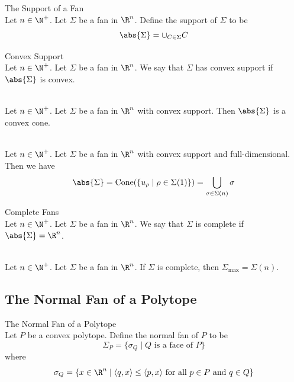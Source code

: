 \documentclass[a4paper]{article}
\begin{document}
\begin{defn}{The Support of a Fan}{}\\
Let $n\in\N^+$. Let $\Sigma$ be a fan in $\R^n$. Define the support of $\Sigma$ to be $$\abs{\Sigma}=\cup_{C\in\Sigma}C$$
\end{defn}

\begin{defn}{Convex Support}{}\\
Let $n\in\N^+$. Let $\Sigma$ be a fan in $\R^n$. We say that $\Sigma$ has convex support if $\abs{\Sigma}$ is convex. 
\end{defn}

\begin{lmm}{}{}\\
Let $n\in\N^+$. Let $\Sigma$ be a fan in $\R^n$ with convex support. Then $\abs{\Sigma}$ is a convex cone. 
\end{lmm}

\begin{lmm}{}{}\\
Let $n\in\N^+$. Let $\Sigma$ be a fan in $\R^n$ with convex support and full-dimensional. Then we have $$\abs{\Sigma}=\text{Cone}(\{u_\rho\;|\;\rho\in\Sigma(1)\})=\bigcup_{\sigma\in\Sigma(n)}\sigma$$
\end{lmm}

\begin{defn}{Complete Fans}{}\\
Let $n\in\N^+$. Let $\Sigma$ be a fan in $\R^n$. We say that $\Sigma$ is complete if $\abs{\Sigma}=\R^n$. 
\end{defn}

\begin{lmm}{}{}\\
Let $n\in\N^+$. Let $\Sigma$ be a fan in $\R^n$. If $\Sigma$ is complete, then $\Sigma_\text{max}=\Sigma(n)$. 
\end{lmm}

\subsection{The Normal Fan of a Polytope}
\begin{defn}{The Normal Fan of a Polytope}{}\\
Let $P$ be a convex polytope. Define the normal fan of $P$ to be $$\Sigma_P=\{\sigma_Q\;|\;Q\text{ is a face of }P\}$$ where $$\sigma_Q=\{x\in\R^n\;|\;\langle q,x\rangle\leq\langle p,x\rangle\text{ for all }p\in P\text{ and }q\in Q\}$$
\end{defn}
\end{document}
